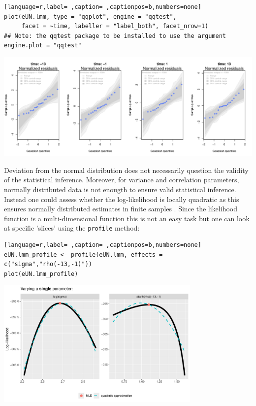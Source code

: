\documentclass[12pt]{article}
\newcommand\Warning[1][3ex]{%
\renewcommand\stacktype{L}%
\scaleto{\stackon[1.3pt]{\color{red}$\triangle$}{\tiny\bfseries !}}{#1}%
\xspace
}
\begin{document}
\begin{lstlisting}[language=r,label= ,caption= ,captionpos=b,numbers=none]
plot(eUN.lmm, type = "qqplot", engine = "qqtest",
     facet = ~time, labeller = "label_both", facet_nrow=1)
## Note: the qqtest package to be installed to use the argument engine.plot = "qqtest" 
\end{lstlisting}

\begin{center}
\includegraphics[width=\textwidth]{./figures/diag-qqplot.pdf}
\end{center}

\Warning Deviation from the normal distribution does not necessarily
question the validity of the statistical inference. Moreover, for
variance and correlation parameters, normally distributed data is not
enougth to ensure valid statistical inference. Instead one could
assess whether the log-likelihood is locally quadratic as this ensures
normally distributed estimates in finite samples
\citep{geyer2013asymptotics}. Since the likelihood function is a
multi-dimensional function this is not an easy task but one can look
at specific 'slices' using the \texttt{profile} method:

\begin{lstlisting}[language=r,label= ,caption= ,captionpos=b,numbers=none]
eUN.lmm_profile <- profile(eUN.lmm, effects = c("sigma","rho(-13,-1)"))
plot(eUN.lmm_profile)
\end{lstlisting}


\begin{center}
\includegraphics[width=0.75\textwidth]{./figures/diag-profileUN.pdf}
\end{center}
\end{document}
